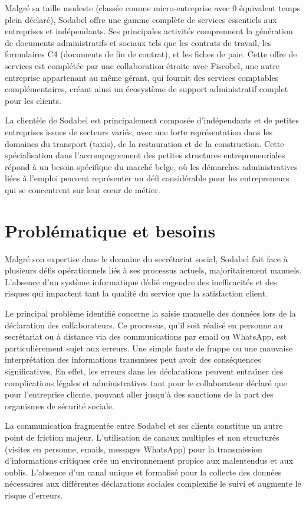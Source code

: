 \documentclass[12pt,a4paper]{report}
\begin{document}
Malgré sa taille modeste (classée comme micro-entreprise avec 0 équivalent temps plein déclaré), Sodabel offre une gamme complète de services essentiels aux entreprises et indépendants. Ses principales activités comprennent la génération de documents administratifs et sociaux tels que les contrats de travail, les formulaires C4 (documents de fin de contrat), et les fiches de paie. Cette offre de services est complétée par une collaboration étroite avec Fiscobel, une autre entreprise appartenant au même gérant, qui fournit des services comptables complémentaires, créant ainsi un écosystème de support administratif complet pour les clients.

La clientèle de Sodabel est principalement composée d'indépendants et de petites entreprises issues de secteurs variés, avec une forte représentation dans les domaines du transport (taxis), de la restauration et de la construction. Cette spécialisation dans l'accompagnement des petites structures entrepreneuriales répond à un besoin spécifique du marché belge, où les démarches administratives liées à l'emploi peuvent représenter un défi considérable pour les entrepreneurs qui se concentrent sur leur cœur de métier.

\section{Problématique et besoins}

Malgré son expertise dans le domaine du secrétariat social, Sodabel fait face à plusieurs défis opérationnels liés à ses processus actuels, majoritairement manuels. L'absence d'un système informatique dédié engendre des inefficacités et des risques qui impactent tant la qualité du service que la satisfaction client.

Le principal problème identifié concerne la saisie manuelle des données lors de la déclaration des collaborateurs. Ce processus, qu'il soit réalisé en personne au secrétariat ou à distance via des communications par email ou WhatsApp, est particulièrement sujet aux erreurs. Une simple faute de frappe ou une mauvaise interprétation des informations transmises peut avoir des conséquences significatives. En effet, les erreurs dans les déclarations peuvent entraîner des complications légales et administratives tant pour le collaborateur déclaré que pour l'entreprise cliente, pouvant aller jusqu'à des sanctions de la part des organismes de sécurité sociale.

La communication fragmentée entre Sodabel et ses clients constitue un autre point de friction majeur. L'utilisation de canaux multiples et non structurés (visites en personne, emails, messages WhatsApp) pour la transmission d'informations critiques crée un environnement propice aux malentendus et aux oublis. L'absence d'un canal unique et formalisé pour la collecte des données nécessaires aux différentes déclarations sociales complexifie le suivi et augmente le risque d'erreurs.
\end{document}
